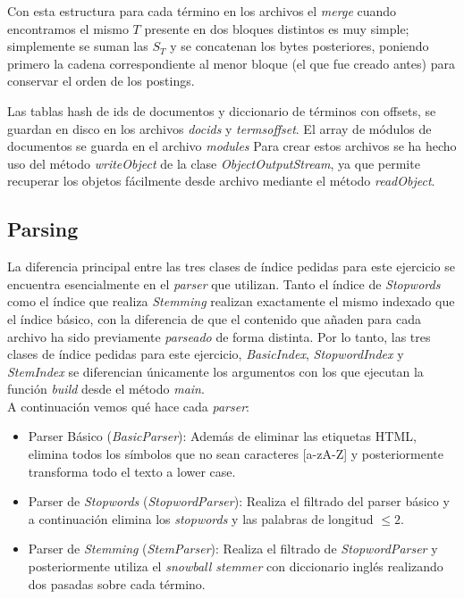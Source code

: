 \documentclass[spanish]{assignment}
\begin{document}
	Con esta estructura para cada término en los archivos el \textit{merge} cuando encontramos el mismo $T$ presente en dos bloques distintos es muy simple; simplemente se suman las $S_T$ y se concatenan los bytes posteriores, poniendo primero la cadena correspondiente al menor bloque (el que fue creado antes) para conservar el orden de los postings.
	
	Las tablas hash de ids de documentos y diccionario de términos con offsets, se guardan en disco en los archivos \textit{docids} y \textit{termsoffset}. El array de módulos de documentos se guarda en el archivo \textit{modules}
	Para crear estos archivos se ha hecho uso del método \textit{writeObject} de la clase \textit{ObjectOutputStream}, ya que permite recuperar los objetos fácilmente desde archivo mediante el método \textit{readObject}.
	
	\subsection{Parsing}
	
	La diferencia principal entre las tres clases de índice pedidas para este ejercicio se encuentra esencialmente en el \textit{parser} que utilizan. Tanto el índice de \textit{Stopwords} como el índice que realiza \textit{Stemming} realizan exactamente el mismo indexado que el índice básico, con la diferencia de que el contenido que añaden para cada archivo ha sido previamente \textit{parseado} de forma distinta. Por lo tanto, las tres clases de índice pedidas para este ejercicio, \textit{BasicIndex}, \textit{StopwordIndex} y \textit{StemIndex} se diferencian únicamente los argumentos con los que ejecutan la función \textit{build} desde el método \textit{main}.\\
	
	A continuación vemos qué hace cada \textit{parser}:
	\begin{itemize}
	\item Parser Básico (\textit{BasicParser}): Además de eliminar las etiquetas HTML, elimina todos los símbolos que no sean caracteres [a-zA-Z] y posteriormente transforma todo el texto a lower case.
	\item Parser de \textit{Stopwords} (\textit{StopwordParser}): Realiza el filtrado del parser básico y a continuación elimina los \textit{stopwords} y las palabras de longitud $\leq 2$.
	\item Parser de \textit{Stemming} (\textit{StemParser}): Realiza el filtrado de \textit{StopwordParser} y posteriormente utiliza el \textit{snowball stemmer} con diccionario inglés realizando dos pasadas sobre cada término.
	\end{itemize}
	
\end{document}
